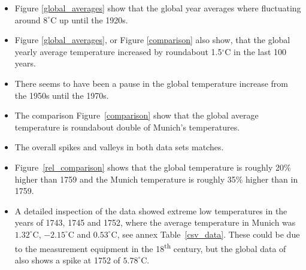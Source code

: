 \documentclass[DIV=11, a4paper, parskip=true]{scrartcl}
\begin{document}
\begin{itemize}
\item Figure \ref{global_averages} show that the global year averages where fluctuating around
$8^\circ$C up until the 1920s.
\item Figure \ref{global_averages}, or Figure \ref{comparison} also show, that the global
yearly average temperature increased by roundabout 1.5$^\circ$C in the last 100 years.
\item There seems to have been a pause in the global temperature increase from the 1950s until
the 1970s.
\item The comparison Figure~\ref{comparison} show that the global average temperature is
roundabout double of Munich's temperatures.
\item The overall spikes and valleys in both data sets matches.
\item Figure~\ref{rel_comparison} shows that the global temperature is roughly 20\% higher than
1759 and the Munich temperature is roughly 35\% higher than in 1759.
\item A detailed inspection of the data showed extreme low temperatures in the years of 1743,
1745 and 1752, where the average temperature in Munich was $1.32^\circ$C, $-2.15^\circ$C and $0.53^\circ$C, see
annex Table~\ref{csv_data}. These could be due to the measurement equipment in the
18\textsuperscript{th} century, but the global data of also shows a spike at 1752 of $5.78^\circ$C.
\end{itemize}


\end{document}
